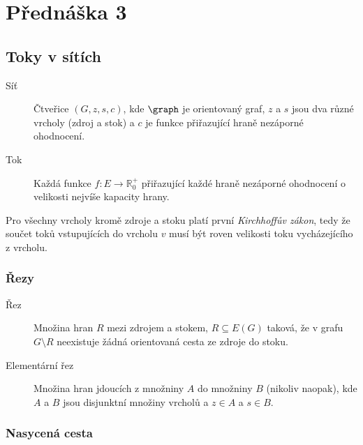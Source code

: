 \section{Přednáška 3}

\subsection{Toky v sítích}

\begin{description}
    \item[Síť] Čtveřice $(G, z, s, c)$, kde $\graph$ je orientovaný graf, $z$ a $s$ jsou dva různé vrcholy (zdroj a stok) a $c$ je funkce přiřazující hraně nezáporné ohodnocení.
    \item[Tok] Každá funkce $ f: E \to \mathbb{R}_0^+ $ přiřazující každé hraně nezáporné ohodnocení o velikosti nejvíše kapacity hrany.
\end{description}

Pro všechny vrcholy kromě zdroje a stoku platí první \textit{Kirchhoffův zákon}, tedy že součet toků vstupujících do vrcholu $v$ musí být roven velikosti toku vycházejícího z vrcholu.

\subsubsection{Řezy}

\begin{description}
    \item[Řez] Množina hran $R$ mezi zdrojem a stokem, $R \subseteq E(G)$ taková, že v grafu $G \setminus R$ neexistuje žádná orientovaná cesta ze zdroje do stoku.
    \item[Elementární řez] Množina hran jdoucích z množniny $A$ do množniny $B$ (nikoliv naopak), kde $A$ a $B$ jsou disjunktní množiny vrcholů a $z \in A$ a $s \in B$.
\end{description}




\subsubsection{Nasycená cesta}

